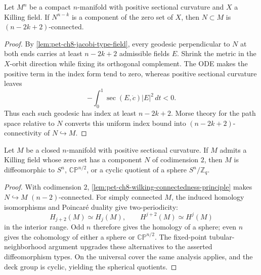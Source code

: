 \begin{lemma}
  \label{lem:pet-ch8-wilking-connectedness-principle}

  Let $M^n$ be a compact $n$-manifold with positive sectional curvature and $X$
  a Killing field. If $N^{n-k}$ is a component of the zero set of $X$, then
  $N\subset M$ is $(n-2k+2)$-connected.
\end{lemma}
\begin{proof}
  \sketch
  By \cref{lem:pet-ch8-jacobi-type-field}, every geodesic perpendicular to
  \(N\) at both ends carries at least \(n-2k+2\) admissible fields \(E\).
  Shrink the metric in the \(X\)-orbit direction while fixing its orthogonal
  complement. The ODE makes the positive term in the index form tend to zero,
  whereas positive sectional curvature leaves
  \[
    -\int_0^1\sec(E,\dot c)|E|^2\,dt<0.
  \]
  Thus each such geodesic has index at least \(n-2k+2\). Morse theory for the
  path space relative to \(N\) converts this uniform index bound into
  \((n-2k+2)\)-connectivity of \(N\hookrightarrow M\).
\end{proof}

\begin{lemma}
  \label{lem:pet-ch8-grove-searle-codim2}

  Let $M$ be a closed $n$-manifold with positive sectional curvature. If $M$
  admits a Killing field whose zero set has a component $N$ of codimension
  $2$, then $M$ is diffeomorphic to $S^n$, $\mathbb{CP}^{n/2}$, or a cyclic
  quotient of a sphere $S^n/\mathbb{Z}_q$.
\end{lemma}
\begin{proof}
  \sketch
  With codimension \(2\),
  \cref{lem:pet-ch8-wilking-connectedness-principle} makes
  \(N\hookrightarrow M\) \((n-2)\)-connected. For simply connected \(M\), the
  induced homology isomorphisms and Poincar\'e duality give two-periodicity:
  \[
    H_{j+2}(M)\simeq H_j(M),\qquad
    H^{j+2}(M)\simeq H^j(M)
  \]
  in the interior range. Odd \(n\) therefore gives the homology of a sphere;
  even \(n\) gives the cohomology of either a sphere or
  \(\mathbb{CP}^{n/2}\). The fixed-point tubular-neighborhood argument upgrades
  these alternatives to the asserted diffeomorphism types. On the universal
  cover the same analysis applies, and the deck group is cyclic, yielding the
  spherical quotients.
\end{proof}

